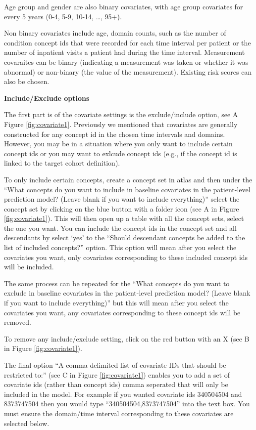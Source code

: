 \documentclass[11pt]{book}
\theoremstyle{definition}
\theoremstyle{definition}
\theoremstyle{definition}
\theoremstyle{remark}
\begin{document}
Age group and gender are also binary covariates, with age group covariates for every 5 years (0-4, 5-9, 10-14, \ldots, 95+).

Non binary covariates include age, domain counts, such as the number of condition concept ids that were recorded for each time interval per patient or the number of inpatient visits a patient had during the time interval. Measurement covaraites can be binary (indicating a measurement was taken or whether it was abnormal) or non-binary (the value of the measurement). Existing risk scores can also be chosen.

\textbf{Include/Exclude options}

The first part is of the covariate settings is the exclude/include option, see A Figure \ref{fig:covariate1}. Previously we mentioned that covariates are generally constructed for any concept id in the chosen time intervals and domains. However, you may be in a situation where you only want to include certain concept ids or you may want to exlcude concept ids (e.g., if the concept id is linked to the target cohort definition).

To only include certain concepts, create a concept set in atlas and then under the ``What concepts do you want to include in baseline covariates in the patient-level prediction model? (Leave blank if you want to include everything)'' select the concept set by clicking on the blue button with a folder icon (see A in Figure \ref{fig:covariate1}). This will then open up a table with all the concept sets, select the one you want. You can include the concept ids in the concept set and all descendants by select `yes' to the ``Should descendant concepts be added to the list of included concepts?'' option. This option will mean after you select the covariates you want, only covariates corresponding to these included concept ids will be included.

The same process can be repeated for the ``What concepts do you want to exclude in baseline covariates in the patient-level prediction model? (Leave blank if you want to include everything)'' but this will mean after you select the covariates you want, any covariates corresponding to these concept ids will be removed.

To remove any include/exclude setting, click on the red button with an X (see B in Figure \ref{fig:covariate1}).

The final option ``A comma delimited list of covariate IDs that should be restricted to:'' (see C in Figure \ref{fig:covariate1}) enables you to add a set of covariate ids (rather than concept ids) comma seperated that will only be included in the model. For example if you wanted covariate ids 340504504 and 8373747504 then you would type ``340504504,8373747504'' into the text box. You must ensure the domain/time interval corresponding to these covariates are selected below.
\end{document}
